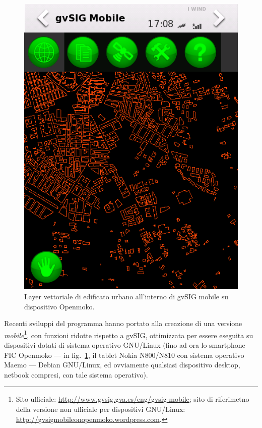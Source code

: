 	\begin{figure}
		\centering
		\includegraphics[scale=0.3]{img/tellus/3359542225_2f1736a093_o}
		\caption{{\small \label{fig:Layer-gvSIG}Layer vettoriale di edificato urbano all'interno di gvSIG mobile su dispositivo Openmoko.}}
	\end{figure}

	Recenti sviluppi del programma hanno portato alla creazione di una versione \emph{mobile}\footnote{Sito ufficiale: \href{http://www.gvsig.gva.es/eng/gvsig-mobile}{http://www.gvsig.gva.es/eng/gvsig-mobile}; sito di riferimetno della versione non ufficiale per dispositivi GNU/Linux: \href{http://gvsigmobileonopenmoko.wordpress.com}{http://gvsigmobileonopenmoko.wordpress.com}.}, con funzioni ridotte rispetto a gvSIG, ottimizzata per essere eseguita su dispositivi dotati di sistema operativo GNU/Linux (fino ad ora lo smartphone FIC Openmoko --- in fig.~\ref{fig:Layer-gvSIG}, il tablet Nokia N800/N810 con sistema operativo Maemo --- Debian GNU/Linux, ed ovviamente qualsiasi dispositivo desktop, netbook compresi, con tale sistema operativo).\\

